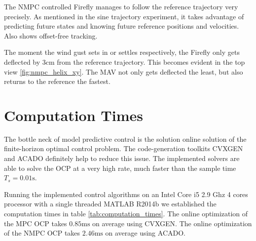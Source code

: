 The NMPC controlled Firefly manages to follow the reference trajectory very precisely. As mentioned in the sine trajectory experiment, it takes advantage of predicting future states and knowing future reference positions and velocities. Also shows offset-free tracking.

The moment the wind gust sets in or settles respectively, the Firefly only gets deflected by $3\si{\centi\metre}$ from the reference trajectory. This becomes evident in the top view \ref{fig:nmpc_helix_xy}. The MAV not only gets deflected the least, but also returns to the reference the fastest.%

\section{Computation Times}
The bottle neck of model predictive control is the solution online solution of the finite-horizon optimal control problem. The code-generation toolkits CVXGEN and ACADO definitely help to reduce this issue. The implemented solvers are able to solve the OCP at a very high rate, much faster than the sample time $T_s = 0.01 \si{\second}$.

Running the implemented control algorithms on an Intel Core i5 2.9 Ghz 4 cores processor with a single threaded MATLAB R2014b we established the computation times in table \ref{tab:computation_times}. The online optimization of the MPC OCP takes $0.85 \si{\milli\second}$ on average using CVXGEN. The online optimization of the NMPC OCP takes $2.46 \si{\milli\second}$ on average using ACADO. 

